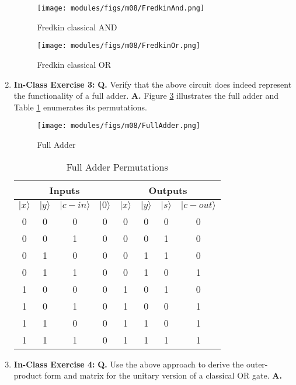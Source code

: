 \documentclass[main.tex]{subfiles}
\begin{document}
\begin{enumerate}
    \begin{figure}
        \centering
        \texttt{[image: modules/figs/m08/FredkinAnd.png]}
        \caption{Fredkin classical AND}
        \label{fig:FredkinAND}
    \end{figure}

    \begin{figure}
        \centering
        \texttt{[image: modules/figs/m08/FredkinOr.png]}
        \caption{Fredkin classical OR}
        \label{fig:FredkinOR}
    \end{figure}

\item[] \textbf{In-Class Exercise 3:} \textbf{Q.} Verify that the above circuit does indeed represent the functionality of a full adder. \textbf{A.} Figure \ref{fig:FullAdder} illustrates the full adder and Table \ref{tab:FullAdderPermutations} enumerates its permutations.

     \begin{figure}
        \centering
        \texttt{[image: modules/figs/m08/FullAdder.png]}
        \caption{Full Adder}
        \label{fig:FullAdder}
    \end{figure}
    
    \begin{table}
        \centering
        \begin{tabular}{ |c|c|c|c|c|c|c|c| } 
         \hline
         \multicolumn{4}{|c|}{Inputs} & \multicolumn{4}{c|}{Outputs} \\ 
         \hline
         $|x\rangle$ & $|y\rangle$ & $|c-in\rangle$ & $|0\rangle$ & $|x\rangle$ & $|y\rangle$ & $|s\rangle$ & $|c-out\rangle$ \\ 
         \hline
         0 & 0 & 0 & 0 & 0 & 0 & 0 & 0 \\ 
         \hline
         0 & 0 & 1 & 0 & 0 & 0 & 1 & 0 \\ 
         \hline
         0 & 1 & 0 & 0 & 0 & 1 & 1 & 0 \\ 
         \hline
         0 & 1 & 1 & 0 & 0 & 1 & 0 & 1 \\ 
         \hline
         1 & 0 & 0 & 0 & 1 & 0 & 1 & 0 \\ 
         \hline
         1 & 0 & 1 & 0 & 1 & 0 & 0 & 1 \\ 
         \hline
         1 & 1 & 0 & 0 & 1 & 1 & 0 & 1 \\ 
         \hline
         1 & 1 & 1 & 0 & 1 & 1 & 1 & 1 \\ 
         \hline
        \end{tabular}
        \caption{Full Adder Permutations}
        \label{tab:FullAdderPermutations}
    \end{table}

\item[] \textbf{In-Class Exercise 4:} \textbf{Q.} Use the above approach to derive the outer-product form and matrix for the unitary version of a classical OR gate. \textbf{A.}

\end{enumerate}
\end{document}
